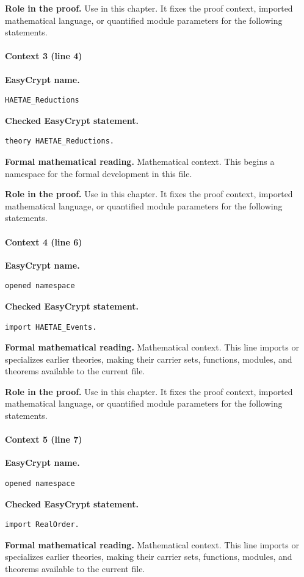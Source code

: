 \noindent\textbf{Role in the proof.}
Use in this chapter. It fixes the proof context, imported mathematical language, or quantified module parameters for the following statements.

\paragraph{Context 3 (line 4)}
\noindent\textbf{EasyCrypt name.}
\begin{lstlisting}[language=EasyCrypt,basicstyle=\ttfamily\scriptsize]
HAETAE_Reductions
\end{lstlisting}
\noindent\textbf{Checked EasyCrypt statement.}
\begin{lstlisting}[language=EasyCrypt,basicstyle=\ttfamily\scriptsize]
theory HAETAE_Reductions.
\end{lstlisting}
\noindent\textbf{Formal mathematical reading.}
Mathematical context. This begins a namespace for the formal development in this file.

\noindent\textbf{Role in the proof.}
Use in this chapter. It fixes the proof context, imported mathematical language, or quantified module parameters for the following statements.

\paragraph{Context 4 (line 6)}
\noindent\textbf{EasyCrypt name.}
\begin{lstlisting}[language=EasyCrypt,basicstyle=\ttfamily\scriptsize]
opened namespace
\end{lstlisting}
\noindent\textbf{Checked EasyCrypt statement.}
\begin{lstlisting}[language=EasyCrypt,basicstyle=\ttfamily\scriptsize]
import HAETAE_Events.
\end{lstlisting}
\noindent\textbf{Formal mathematical reading.}
Mathematical context. This line imports or specializes earlier theories, making their carrier sets, functions, modules, and theorems available to the current file.

\noindent\textbf{Role in the proof.}
Use in this chapter. It fixes the proof context, imported mathematical language, or quantified module parameters for the following statements.

\paragraph{Context 5 (line 7)}
\noindent\textbf{EasyCrypt name.}
\begin{lstlisting}[language=EasyCrypt,basicstyle=\ttfamily\scriptsize]
opened namespace
\end{lstlisting}
\noindent\textbf{Checked EasyCrypt statement.}
\begin{lstlisting}[language=EasyCrypt,basicstyle=\ttfamily\scriptsize]
import RealOrder.
\end{lstlisting}
\noindent\textbf{Formal mathematical reading.}
Mathematical context. This line imports or specializes earlier theories, making their carrier sets, functions, modules, and theorems available to the current file.

